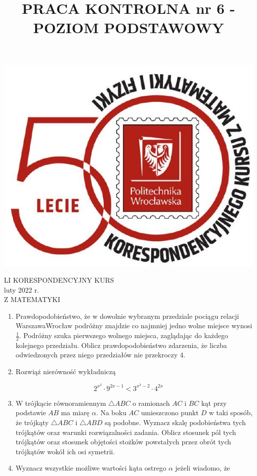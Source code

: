 \documentclass[10pt]{article}
\title{PRACA KONTROLNA nr 6 - POZIOM PODSTAWOWY }
\author{}
\date{}
\begin{document}
\maketitle
\begin{center}
\includegraphics[max width=\textwidth]{2024_11_16_690f90abc8416738f16cg-1}
\end{center}

LI KORESPONDENCYJNY KURS\\
luty 2022 r.\\
Z MATEMATYKI

\begin{enumerate}
  \item Prawdopodobieństwo, że w dowolnie wybranym przedziale pociągu relacji WarszawaWrocław podróżny znajdzie co najmniej jedno wolne miejsce wynosi $\frac{1}{2}$. Podróżny szuka pierwszego wolnego miejsca, zaglądając do każdego kolejnego przedziału. Oblicz prawdopodobieństwo zdarzenia, że liczba odwiedzonych przez niego przedziałów nie przekroczy 4.
  \item Rozwiąż nierówność wykładniczą
\end{enumerate}

$$
2^{x^{3}} \cdot 9^{2 x-1}<3^{x^{3}-2} \cdot 4^{2 x}
$$

\begin{enumerate}
  \setcounter{enumi}{2}
  \item W trójkącie równoramiennym $\triangle A B C$ o ramionach $A C$ i $B C$ kąt przy podstawie $A B$ ma miarę $\alpha$. Na boku $A C$ umieszczono punkt $D$ w taki sposób, że trójkąty $\triangle A B C$ i $\triangle A B D$ są podobne. Wyznacz skalę podobieństwa tych trójkątów oraz warunki rozwiązalności zadania. Oblicz stosunek pól tych trójkątów oraz stosunek objętości stożków powstałych przez obrót tych trójkątów wokół ich osi symetrii.
  \item Wyznacz wszystkie możliwe wartości kąta ostrego $\alpha$ jeżeli wiadomo, że
\end{enumerate}
\end{document}
